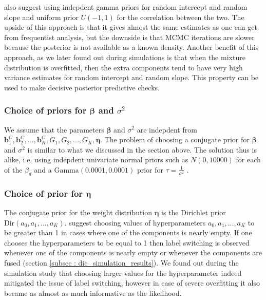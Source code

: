  \citet[pg. 260]{lesaffre_bayesian_2012} also suggest using indepdent gamma priors for random intercept and random slope and uniform prior $U(-1,1)$ for the correlation between the two. The upside of this approach is that it gives almost the same estimates as one can get from frequentist analysis, but the downside is that MCMC iterations are slower because the posterior is not available as a known density. Another benefit of this approach, as we later found out during simulations is that when the mixture distribution is overfitted, then the extra components tend to have very high variance estimates for random intercept and random slope. This property can be used to make decisive posterior predictive checks.

\subsubsection{Choice of priors for $\boldsymbol{\beta}$ and $\sigma^2$}
We assume that the parameters $\boldsymbol{\beta}$ and $\sigma^2$ are indepdent from $\boldsymbol{b}_1^C, \boldsymbol{b}_2^C, ..., \boldsymbol{b}_K^C, G_1, G_2, ..., G_K, \boldsymbol{\eta}$. The problem of choosing a conjugate prior for $\boldsymbol{\beta}$ and $\sigma^2$ is similar to what we discussed in the section above. The solution thus is alike, i.e. using indepdent univariate normal priors such as $N(0, 10000)$ for each of the $\beta_d$ and a $\text{Gamma}(0.0001, 0.0001)$ prior for $\tau = \frac 1 {\sigma^2}$ \citep[chap. 17]{gelman_data_2006}.

\subsubsection{Choice of prior for $\boldsymbol{\eta}$}
The conjugate prior for the weight distribution $\boldsymbol{\eta}$ is the Dirichlet prior $\text{Dir}(a_0, a_1,..., a_K)$. \citet[pg. 105]{fruhwirth-schnatter_finite_2013} suggest choosing values of hyperparameters $a_0, a_1,..., a_K$ to be greater than 1 in cases where one of the components is nearly empty. If one chooses the hyperparameters to be equal to 1 then label switching is observed whenever one of the components is nearly empty or whenever the components are fused (section \ref{subsec : dic_simulation_results}). We found out during the simulation study that choosing larger values for the hyperparameter indeed mitigated the issue of label switching, however in case of severe overfitting it also became as almost as much informative as the likelihood.

